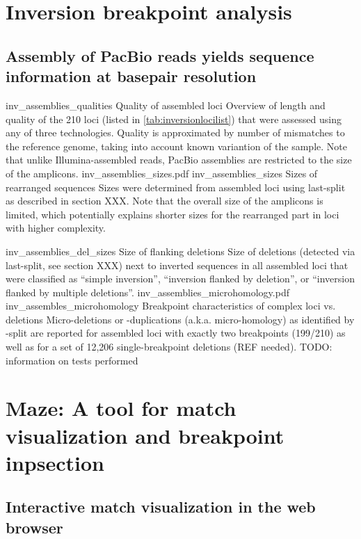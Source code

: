 \section{Inversion breakpoint analysis}
\subsection{Assembly of PacBio reads yields sequence information at basepair resolution}



    {inv_assemblies_qualities}
    {Quality of assembled loci}
    {Overview of length and quality of the 210 loci (listed in
    \cref{tab:inversionlocilist}) that were assessed using
    any of three technologies. Quality is approximated by number of mismatches
    to the reference genome, taking into account known variantion of the sample.
    Note that unlike Illumina-assembled reads, PacBio assemblies are restricted
    to the size of the amplicons.}
        {inv_assemblies_sizes.pdf}
    {inv_assemblies_sizes}
    {Sizes of rearranged sequences}
    {Sizes were determined from assembled loci using \acs{last}-split as
    described in section XXX. Note that the overall size of the amplicons is
    limited, which potentially explains shorter sizes for the rearranged part in
    loci with higher complexity.}

    {inv_assemblies_del_sizes}
    {Size of flanking deletions}
    {Size of deletions (detected via \acs{last}-split, see section XXX) next to
    inverted sequences in all assembled loci that were classified as
    ``simple inversion'', ``inversion flanked by deletion'', or ``inversion
    flanked by multiple deletions''.}
        {inv_assemblies_microhomology.pdf}
    {inv_assembles_microhomology}
    {Breakpoint characteristics of complex loci vs. deletions}
    {Micro-deletions or -duplications (a.k.a. micro-homology) as identified by
    \last-split are reported for assembled loci with exactly two breakpoints
    (199/210) as well as for a set of 12,206 single-breakpoint deletions (REF needed).
    TODO: information on tests performed}

\section{Maze: A tool for match visualization and breakpoint inpsection}
\subsection{Interactive match visualization in the web browser}
\label{sec:dotplot}


